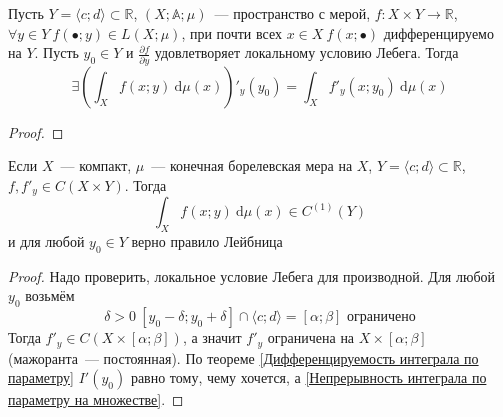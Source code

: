 \documentclass{article}
\begin{document}
    \begin{theorem}
        \label{Дифференцируемость интеграла по параметру}
        Пусть $Y=\langle c;d\rangle\subset\mathbb R$, $(X;\mathbb A;\mu)$~--- пространство с мерой, $f\colon X\times Y\to\mathbb R$, $\forall y\in Y~f(\bullet;y)\in L(X;\mu)$, при почти всех $x\in X~f(x;\bullet)$ дифференцируемо на $Y$. Пусть $y_0\in Y$ и $\frac{\partial f}{\partial y}$ удовлетворяет локальному условию Лебега. Тогда
        $$
        \exists\left(\int_X f(x;y)~\mathrm d\mu(x)\right)'_y(y_0)=\int_Xf'_y(x;y_0)~\mathrm d\mu(x)
        $$
    \end{theorem}
    \begin{proof}
        
    \end{proof}
    \begin{corollary}
        Если $X$~--- компакт, $\mu$~--- конечная борелевская мера на $X$, $Y=\langle c;d\rangle\subset\mathbb R$, $f,f'_y\in C(X\times Y)$. Тогда
        $$
        \int_X f(x;y)~\mathrm d\mu(x)\in C^{(1)}(Y)
        $$
        и для любой $y_0\in Y$ верно правило Лейбница
    \end{corollary}
    \begin{proof}
        Надо проверить, локальное условие Лебега для производной. Для любой $y_0$ возьмём 
        $$
        \delta>0~[y_0-\delta;y_0+\delta]\cap\langle c;d\rangle=[\alpha;\beta]\text{ ограничено}
        $$
        Тогда $f'_y\in C(X\times[\alpha;\beta])$, а значит $f'_y$ ограничена на $X\times[\alpha;\beta]$ (мажоранта~--- постоянная). По теореме \ref{Дифференцируемость интеграла по параметру} $I'(y_0)$ равно тому, чему хочется, а \ref{Непрерывность интеграла по параметру на множестве}.
    \end{proof}
\end{document}
